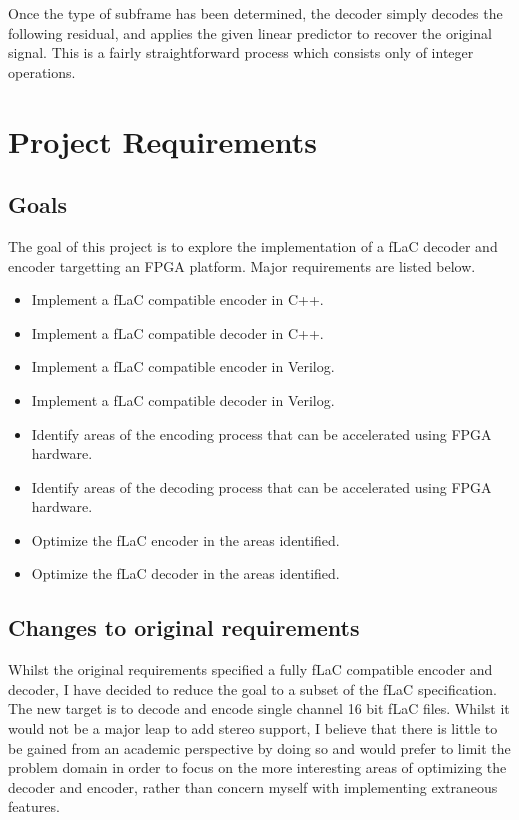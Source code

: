 \documentclass[12pt]{scrartcl}
\begin{document}
  Once the type of subframe has been determined, the decoder simply decodes the following residual, and applies the given linear predictor to recover the original signal. This is a fairly straightforward process which consists only of integer operations.
  
  \section{Project Requirements}
  \subsection{Goals}
  The goal of this project is to explore the implementation of a fLaC decoder and encoder targetting an FPGA platform. Major requirements are listed below.
  \begin{itemize}
    \item Implement a fLaC compatible encoder in C++.
    \item Implement a fLaC compatible decoder in C++.
    \item Implement a fLaC compatible encoder in Verilog.
    \item Implement a fLaC compatible decoder in Verilog.
    \item Identify areas of the encoding process that can be accelerated using FPGA hardware.
    \item Identify areas of the decoding process that can be accelerated using FPGA hardware.
    \item Optimize the fLaC encoder in the areas identified.
    \item Optimize the fLaC decoder in the areas identified.
  \end{itemize}
  
  \subsection{Changes to original requirements}
  Whilst the original requirements specified a fully fLaC compatible encoder and decoder, I have decided to reduce the goal to a subset of the fLaC specification. The new target is to decode and encode single channel 16 bit fLaC files. Whilst it would not be a major leap to add stereo support, I believe that there is little to be gained from an academic perspective by doing so and would prefer to limit the problem domain in order to focus on the more interesting areas of optimizing the decoder and encoder, rather than concern myself with implementing extraneous features.\\
      
\end{document}
